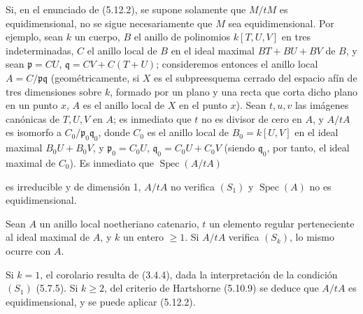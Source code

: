 \begin{remark}[5.12.3]
\label{IV.2.s5.12.3-fr}
Si, en el enunciado de (5.12.2), se supone solamente que $M/tM$ es
equidimensional, no se sigue necesariamente que $M$ sea equidimensional. Por
ejemplo, sean $k$ un cuerpo, $B$ el anillo de polinomios $k[T,U,V]$ en tres
indeterminadas, $C$ el anillo local de $B$ en el ideal maximal $BT+BU+BV$ de
$B$, y sean $\mathfrak p=CU$, $\mathfrak q=CV+C(T+U)$; consideremos entonces
el anillo local $A=C/\mathfrak p\mathfrak q$ (geométricamente, si $X$ es el
subpreesquema cerrado del espacio afín de tres dimensiones sobre $k$, formado
por un plano y una recta que corta dicho plano en un punto $x$, $A$ es el
anillo local de $X$ en el punto $x$). Sean $t,u,v$ las imágenes canónicas de
$T,U,V$ en $A$; es inmediato que $t$ no es divisor de cero en $A$, y $A/tA$
es isomorfo a $C_0/\mathfrak p_0\mathfrak q_0$, donde $C_0$ es el anillo local
de $B_0=k[U,V]$ en el ideal maximal $B_0U+B_0V$, y
$\mathfrak p_0=C_0U$, $\mathfrak q_0=C_0U+C_0V$ (siendo $\mathfrak q_0$, por
tanto, el ideal maximal de $C_0$). Es inmediato que $\operatorname{Spec}(A/tA)$


es irreducible y de dimensión 1, $A/tA$ no verifica $(S_1)$ y
$\operatorname{Spec}(A)$ no es equidimensional.
\end{remark}

\begin{corollary}[5.12.4]
\label{IV.2.s5.12.4-fr}
Sean $A$ un anillo local noetheriano catenario, $t$ un elemento regular
perteneciente al ideal maximal de $A$, y $k$ un entero $\geq1$. Si $A/tA$
verifica $(S_k)$, lo mismo ocurre con $A$.
\end{corollary}

Si $k=1$, el corolario resulta de (3.4.4), dada la interpretación de la
condición $(S_1)$ (5.7.5). Si $k\geq2$, del criterio de Hartshorne (5.10.9) se
deduce que $A/tA$ es equidimensional, y se puede aplicar (5.12.2).
